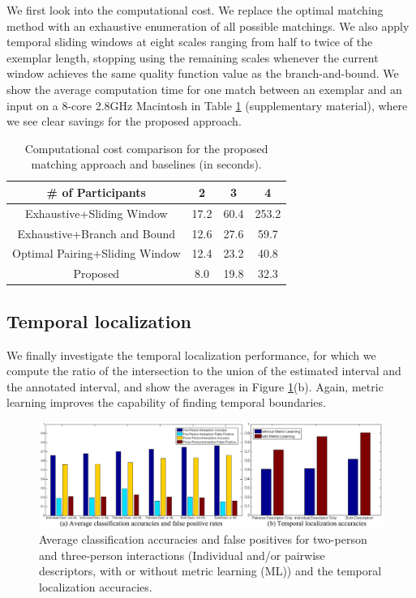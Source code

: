 \documentclass[10pt,twocolumn,letterpaper]{article}
\begin{document}
We first look into the computational cost. We replace the optimal matching method with an exhaustive enumeration of all possible matchings. We also apply temporal sliding windows at eight scales ranging from half to twice of the exemplar length, stopping using the remaining scales whenever the current window achieves the same quality function value as the branch-and-bound. We show the average computation time for one match between an exemplar and an input on a 8-core 2.8GHz Macintosh in Table \ref{computecost} (supplementary material), where we see clear savings for the proposed approach.


\begin{table}[h]
\centering \caption{Computational cost comparison for the proposed matching approach and baselines (in seconds).}
\footnotesize{
\begin{tabular}{|c|c|c|c|}
\hline    \# of Participants &  2  &  3  &  4   \\
\hline   Exhaustive+Sliding Window & 17.2   & 60.4   & 253.2   \\
\hline  Exhaustive+Branch and Bound &  12.6 &  27.6  &   59.7 \\
\hline  Optimal Pairing+Sliding Window & 12.4  & 23.2   &  40.8  \\
\hline  Proposed & 8.0  &  19.8  &  32.3  \\
\hline 
\end{tabular}
}
\label{computecost}
\end{table}

\subsection{Temporal localization}
We finally investigate the temporal localization performance, for which we compute the ratio of the intersection to the union of the estimated interval and the annotated interval, and show the averages in Figure \ref{classtemporal}(b).  Again, metric learning improves the capability of finding temporal boundaries.

\begin{figure}[t]
\begin{center}
\includegraphics[scale=2.5]{classtemporal.png}
\end{center}
\caption{Average classification accuracies and false positives for two-person and three-person interactions (Individual and/or pairwise descriptors, with or without metric learning (ML)) and the temporal localization accuracies.}
\label{classtemporal}
\end{figure}
\end{document}
